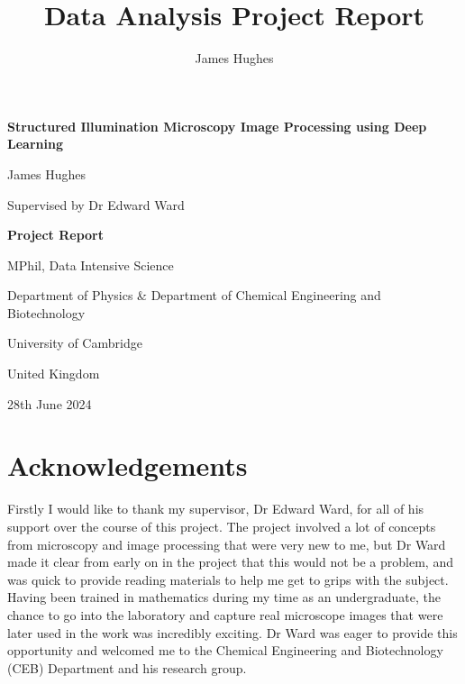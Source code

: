 \documentclass[12pt]{article}
\title{Data Analysis Project Report}
\author{James Hughes}
\begin{document}
\begin{titlepage}
    \begin{center}
        \vspace*{5cm}

        \Huge
        \textbf{Structured Illumination Microscopy Image Processing using Deep Learning}

        \vspace{0.5cm}
        \LARGE

        James Hughes

        Supervised by Dr Edward Ward

        \vspace{2cm}
        \Huge
        \textbf{Project Report}

        \vfill

        MPhil, Data Intensive Science

        \vspace{0.8cm}

        \Large
        Department of Physics \& Department of Chemical Engineering and Biotechnology

        University of Cambridge

        United Kingdom

        28th June 2024

    \end{center}
\end{titlepage}


\newpage
\section*{Acknowledgements}

Firstly I would like to thank my supervisor, Dr Edward Ward, for all of his support over the course of this project.
The project involved a lot of concepts from microscopy and image processing that were very new to me,
but Dr Ward made it clear from early on in the project that this would not be a problem,
and was quick to provide reading materials to help me get to grips with the subject.
Having been trained in mathematics during my time as an undergraduate,
the chance to go into the laboratory and capture real microscope images that were later used in the work was incredibly exciting.
Dr Ward was eager to provide this opportunity and welcomed me to the Chemical Engineering and Biotechnology (CEB) Department and his research group.
\end{document}
